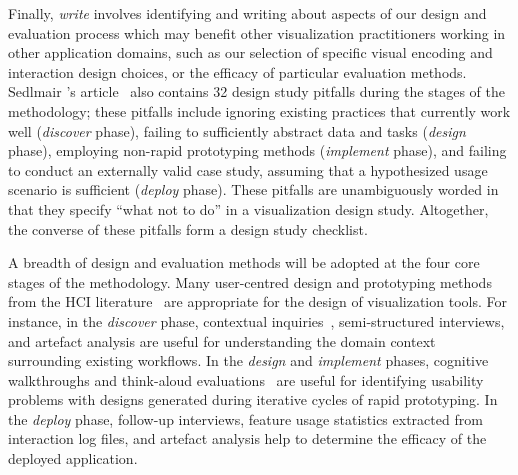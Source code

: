Finally, {\it write} involves identifying and writing about aspects of our design and evaluation process which may benefit other visualization practitioners working in other application domains, such as our selection of specific visual encoding and interaction design choices, or the efficacy of particular evaluation methods. 
Sedlmair \etal's article~\cite{Sedlmair2012} also contains 32 design study pitfalls during the stages of the methodology; these pitfalls include ignoring existing practices that currently work well ({\it discover} phase), failing to sufficiently abstract data and tasks ({\it design} phase), employing non-rapid prototyping methods ({\it implement} phase), and failing to conduct an externally valid case study, assuming that a hypothesized usage scenario is sufficient ({\it deploy} phase). 
These pitfalls are unambiguously worded in that they specify ``what not to do'' in a visualization design study. 
Altogether, the converse of these pitfalls form a design study checklist.

A breadth of design and evaluation methods will be adopted at the four core stages of the methodology. 
Many user-centred design and prototyping methods from the \ac{HCI} literature~\cite{Dix2004} are appropriate for the design of visualization tools. 
For instance, in the {\it discover} phase, contextual inquiries~\cite{Holtzblatt1993}, semi-structured interviews, and artefact analysis are useful for understanding the domain context surrounding existing workflows. 
In the {\it design} and {\it implement} phases, cognitive walkthroughs and think-aloud evaluations~\cite{Dix2004} are useful for identifying usability problems with designs generated during iterative cycles of rapid prototyping. 
In the {\it deploy} phase, follow-up interviews, feature usage statistics extracted from interaction log files, and artefact analysis help to determine the efficacy of the deployed application.

